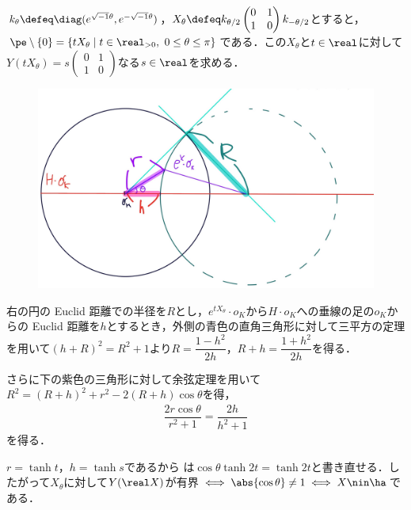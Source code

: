 \begin{npfwn}


  $k_{\theta} \defeq \diag(e^{\sqrt{-1}\theta},e^{-\sqrt{-1}\theta}) $，$X_{\theta} \defeq k_{\theta/2}
  \begin{pmatrix}
    0 & 1 \\ 1 & 0
  \end{pmatrix}
  k_{-\theta/2}$とすると，$\pe\setminus\{0\} =  \{tX_{\theta}\mid t\in \real_{>0},\ 0\leq \theta\leq \pi\}$である．この$X_{\theta} $と$t\in \real$に対して$Y(tX_{\theta} ) = s
  \begin{pmatrix}
    0 & 1 \\ 1 & 0
  \end{pmatrix}
  $なる$s\in \real $を求める．


  
  \begin{figure}[H]
    \centering
    \includegraphics[scale=0.08]{../graph/yosou-eg-1.jpg}
    \caption{}
    \label{fig:yosou-eg-1}
  \end{figure}

  右の円の Euclid 距離での半径を$R$とし，$e^{tX_{\theta}}\cdot o_K $から$H\cdot o_K$への垂線の足の$o_K$からの Euclid 距離を$h$とするとき，外側の青色の直角三角形に対して三平方の定理を用いて$(h+R)^2 = R^2 +  1 $より$R = \dfrac{1-h^2}{2h}$，$R+h = \dfrac{1+h^2}{2h}  $を得る．

  さらに下の紫色の三角形に対して余弦定理を用いて${R^2 = (R+h)^2 + r^2 - 2(R+h) \cos\theta }$を得，
  \begin{align}
    {\dfrac{2r\cos\theta}{r^2 + 1} = \dfrac{2h}{h^2 + 1} }\label{eq:1018-main}
  \end{align}
  を得る．

  $r = \tanh t$，$h = \tanh s$であるから は$\cos\theta \tanh 2t = \tanh 2t $と書き直せる．したがって$X_{\theta}$に対して$Y(\real X) $が有界$\iff \abs{\cos\theta}\neq 1 \iff  X\nin \ha  $である．
\end{npfwn}

